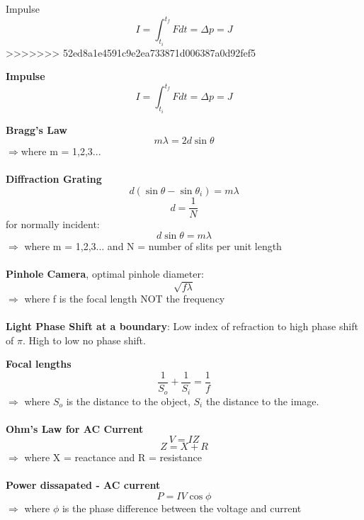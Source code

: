 \documentclass{article}
\begin{document}
{Impulse\begin{equation}I = \int_{t_i}^{t_f} Fdt = \Delta p = J \end{equation}
>>>>>>> 52ed8a1e4591c9e2ea733871d006387a0d92fef5

{\bf{Impulse}}\begin{equation}I = \int_{t_i}^{t_f} Fdt = \Delta p = J \end{equation}

{\bf{Bragg's Law}}\begin{equation} m\lambda = 2d\sin{\theta}\end{equation}
$\Rightarrow$where m = 1,2,3...\\
\\
{\bf{Diffraction Grating}}\begin{equation}d(\sin{\theta}-\sin{\theta_i}) = m\lambda \end{equation}
\begin{equation}d = \frac{1}{N}\end{equation}
\hspace*{.5in}for normally incident:
\begin{equation}d\sin{\theta} = m\lambda\end{equation}
$\Rightarrow$ where m = 1,2,3... and N = number of slits per unit length\\
\\
{\bf{Pinhole Camera}}, optimal pinhole diameter:\begin{equation}\sqrt{f\lambda}\end{equation}
$\Rightarrow$ where f is the focal length NOT the frequency\\
\\
{\bf{Light Phase Shift at a boundary}}: Low index of refraction to high phase shift of $\pi$.  High to low no phase shift.

{\bf{Focal lengths}}\begin{equation}\frac{1}{S_o}+\frac{1}{S_i} = \frac{1}{f}\end{equation}
$\Rightarrow$ where $S_o$ is the distance to the object, $S_i$ the distance to the image.\\
\\
{\bf{Ohm's Law for AC Current}}\begin{equation}V = IZ\end{equation}
\begin{equation}Z = X + R\end{equation}
$\Rightarrow$ where X = reactance and R = resistance\\
\\
{\bf{Power dissapated - AC current}}\begin{equation}P = IV\cos{\phi}\end{equation}
$\Rightarrow$ where $\phi$ is the phase difference between the voltage and current 




}
\end{document}
